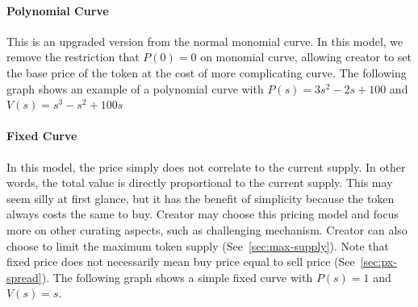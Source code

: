 \documentclass[letterpaper,11pt]{article}
\begin{document}
\paragraph{Polynomial Curve} This is an upgraded version from the normal monomial curve. In this model, we remove the restriction that $P(0) = 0$ on monomial curve, allowing creator to set the base price of the token at the cost of more complicating curve. The following graph shows an example of a polynomial curve with $P(s) = 3s^2 - 2s + 100$ and $V(s) = s^3 - s^2 + 100s$

\begin{center}
\end{center}

\paragraph{Fixed Curve} In this model, the price simply does not correlate to the current supply. In other words, the total value is directly proportional to the current supply. This may seem silly at first glance, but it has the benefit of simplicity because the token always costs the same to buy. Creator may choose this pricing model and focus more on other curating aspects, such as challenging mechanism. Creator can also choose to limit the maximum token supply (See~\cref{sec:max-supply}). Note that fixed price does not necessarily mean buy price equal to sell price (See~\cref{sec:px-spread}). The following graph shows a simple fixed curve with $P(s) = 1$ and $V(s) = s$.

\begin{center}
\end{center}
\end{document}
